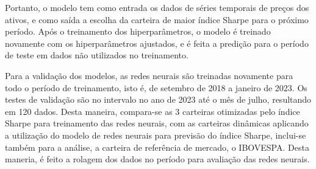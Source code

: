         \ipar Portanto, o modelo tem como entrada os dados de séries temporais de preços dos ativos, e como saída a escolha da carteira de maior índice Sharpe para o próximo período. Após o treinamento dos hiperparâmetros, o modelo é treinado novamente com os hiperparâmetros ajustados, e é feita a predição para o período de teste em dados não utilizados no treinamento.


        \ipar Para a validação dos modelos, as redes neurais são treinadas novamente para todo o período de treinamento, isto é, de setembro de 2018 a janeiro de 2023. Os testes de validação são no intervalo no ano de 2023 até o mês de julho, resultando em 120 dados. Desta maneira, compara-se as 3 carteiras otimizadas pelo índice Sharpe para treinamento das redes neurais, com as carteiras dinâmicas aplicando a utilização do modelo de redes neurais para previsão do índice Sharpe, inclui-se também para a análise, a carteira de referência de mercado, o \acrshort{IBOVESPA}. Desta maneria, é feito a rolagem dos dados no período para avaliação das redes neurais.

\pagebreak
